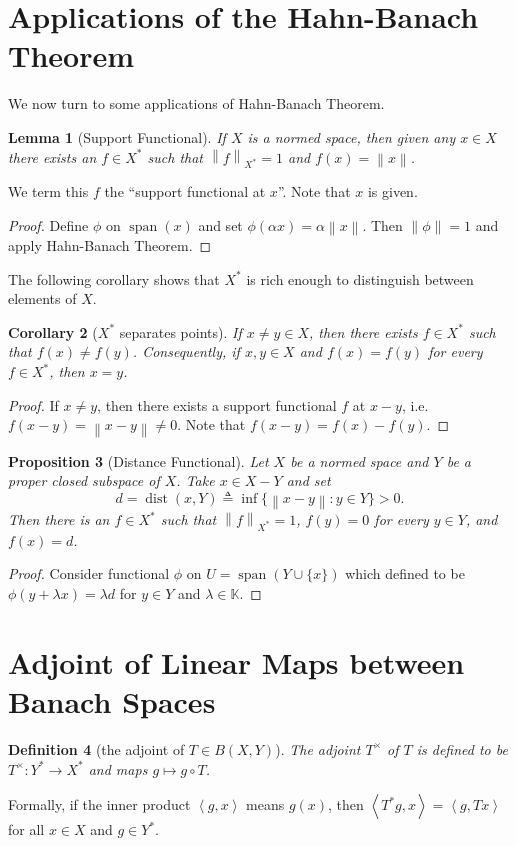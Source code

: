 \documentclass[12pt,a4paper]{report}
\numberwithin{equation}{section}
\theoremstyle{mystyle}
\newtheorem{definition}{Definition}[section]
\newtheorem{lemma}[definition]{Lemma}
\newtheorem{corollary}[definition]{Corollary}
\newtheorem{proposition}[definition]{Proposition}
\newcommand{\K}{\mathbb{K}}
\newcommand{\norm}[1]{\left\lVert #1 \right\rVert}
\newcommand{\inner}[1]{\left\langle #1 \right\rangle}
\newcommand{\spn}{\operatorname{span}}
\newcommand{\dist}{\operatorname{dist}}
\begin{document}
	\section{Applications of the Hahn-Banach Theorem}
	We now turn to some applications of Hahn-Banach Theorem.
	\begin{lemma}[Support Functional]\label{lem:support functional}
		If $X$ is a normed space, then given any $x\in X$ there exists an $f\in X^*$ such that $\norm{f}_{X^*}=1$ and $f(x)=\norm{x}$.
	\end{lemma}
	We term this $f$ the ``support functional at $x$''. Note that $x$ is given.
	\begin{proof}
		Define $\phi$ on $\spn(x)$ and set $\phi(\alpha x)=\alpha\norm{x}$. Then $\norm{\phi}=1$ and apply Hahn-Banach Theorem.
	\end{proof}
	The following corollary shows that $X^*$ is rich enough to distinguish between elements of $X$.
	\begin{corollary}[$X^*$ separates points]
		If $x\neq y\in X$, then there exists $f\in X^*$ such that $f(x)\neq f(y)$. Consequently, if $x,y\in X$ and $f(x)=f(y)$ for every $f\in X^*$, then $x=y$.
	\end{corollary}
	\begin{proof}
		If $x\neq y$, then there exists a support functional $f$ at $x-y$, i.e. $f(x-y)=\norm{x-y}\neq 0$. Note that $f(x-y)=f(x)-f(y)$.
	\end{proof}
	
	\begin{proposition}[Distance Functional]\label{prop:distance functional}
		Let $X$ be a normed space and $Y$ be a proper closed subspace of $X$. Take $x\in X-Y$ and set
		\begin{equation}
			d=\dist(x,Y)\triangleq \inf\{\norm{x-y}:y\in Y\}>0.
		\end{equation}
		Then there is an $f\in X^*$ such that $\norm{f}_{X^*}=1$, $f(y)=0$ for every $y\in Y$, and $f(x)=d$.
	\end{proposition}
	\begin{proof}
		Consider functional $\phi$ on $U=\spn(Y\cup \{x\})$ which defined to be $\phi(y+\lambda x)=\lambda d$ for $y\in Y$ and $\lambda\in \K$.
	\end{proof}
	

	\section{Adjoint of Linear Maps between Banach Spaces}
	\begin{definition}[the adjoint of $T\in B(X,Y)$]
		The \emph{adjoint} $T^\times$ of $T$ is defined to be $T^\times: Y^* \to X^*$ and maps $g\mapsto g\circ T$.
	\end{definition}
	Formally, if the inner product $\inner{g, x}$ means $g(x)$, then $\inner{T^*g,x}=\inner{g,Tx}$ for all $x\in X$ and $g\in Y^*$.
	
\end{document}
